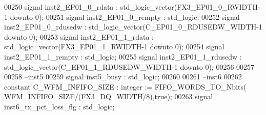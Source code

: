 \begin{DoxyCode}
00250 \textcolor{keywordflow}{signal} \textcolor{vhdlchar}{inst2_EP01_0_rdata}        \textcolor{vhdlchar}{:} \textcolor{comment}{std\_logic\_vector}\textcolor{vhdlchar}{(}\textcolor{vhdlchar}{FX3_EP01_0_RWIDTH}\textcolor{vhdlchar}{-}\textcolor{vhdllogic}{}\textcolor{vhdllogic}{1} \textcolor{keywordflow}{downto} \textcolor{vhdllogic}{}\textcolor{vhdllogic}{0}\textcolor{vhdlchar}{)};
00251 \textcolor{keywordflow}{signal} \textcolor{vhdlchar}{inst2_EP01_0_rempty}       \textcolor{vhdlchar}{:} \textcolor{comment}{std\_logic};
00252 \textcolor{keywordflow}{signal} \textcolor{vhdlchar}{inst2_EP01_0_rdusedw}      \textcolor{vhdlchar}{:} \textcolor{comment}{std\_logic\_vector}\textcolor{vhdlchar}{(}\textcolor{vhdlchar}{C_EP01_0_RDUSEDW_WIDTH}\textcolor{vhdlchar}{-}\textcolor{vhdllogic}{}\textcolor{vhdllogic}{1} \textcolor{keywordflow}{downto} \textcolor{vhdllogic}{}\textcolor{vhdllogic}{0}\textcolor{vhdlchar}{)};
00253 \textcolor{keywordflow}{signal} \textcolor{vhdlchar}{inst2_EP01_1_rdata}        \textcolor{vhdlchar}{:} \textcolor{comment}{std\_logic\_vector}\textcolor{vhdlchar}{(}\textcolor{vhdlchar}{FX3_EP01_1_RWIDTH}\textcolor{vhdlchar}{-}\textcolor{vhdllogic}{}\textcolor{vhdllogic}{1} \textcolor{keywordflow}{downto} \textcolor{vhdllogic}{}\textcolor{vhdllogic}{0}\textcolor{vhdlchar}{)};
00254 \textcolor{keywordflow}{signal} \textcolor{vhdlchar}{inst2_EP01_1_rempty}       \textcolor{vhdlchar}{:} \textcolor{comment}{std\_logic};
00255 \textcolor{keywordflow}{signal} \textcolor{vhdlchar}{inst2_EP01_1_rdusedw}      \textcolor{vhdlchar}{:} \textcolor{comment}{std\_logic\_vector}\textcolor{vhdlchar}{(}\textcolor{vhdlchar}{C_EP01_1_RDUSEDW_WIDTH}\textcolor{vhdlchar}{-}\textcolor{vhdllogic}{}\textcolor{vhdllogic}{1} \textcolor{keywordflow}{downto} \textcolor{vhdllogic}{}\textcolor{vhdllogic}{0}\textcolor{vhdlchar}{)};
00256 
00257 
00258 \textcolor{keyword}{--inst5}
00259 \textcolor{keywordflow}{signal} \textcolor{vhdlchar}{inst5_busy} \textcolor{vhdlchar}{:} \textcolor{comment}{std\_logic};
00260 
00261 \textcolor{keyword}{--inst6}
00262 \textcolor{keywordflow}{constant} \textcolor{vhdlchar}{C_WFM_INFIFO_SIZE}          \textcolor{vhdlchar}{:} \textcolor{comment}{integer} \textcolor{vhdlchar}{:=} \textcolor{vhdlchar}{FIFO\_WORDS\_TO\_Nbits}\textcolor{vhdlchar}{(}\textcolor{vhdlchar}{
      WFM_INFIFO_SIZE}\textcolor{vhdlchar}{/}\textcolor{vhdlchar}{(}\textcolor{vhdlchar}{FX3_DQ_WIDTH}\textcolor{vhdlchar}{/}\textcolor{vhdllogic}{}\textcolor{vhdllogic}{8}\textcolor{vhdlchar}{)}\textcolor{vhdlchar}{,}\textcolor{vhdlchar}{true}\textcolor{vhdlchar}{)};
00263 \textcolor{keywordflow}{signal} \textcolor{vhdlchar}{inst6_tx_pct_loss_flg}        \textcolor{vhdlchar}{:} \textcolor{comment}{std\_logic};

\end{DoxyCode}
